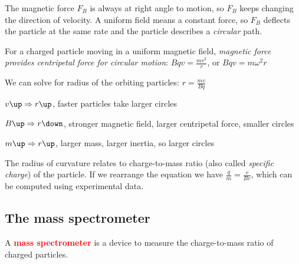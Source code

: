 \documentclass[a4paper,12pt]{book}
\newenvironment{ilight}
  {\centering
  	\vspace*{6pt}
  	\begin{tcolorbox}[colframe=Gray,colback=LightGrey!15]
  \setlength{\baselineskip}{\baselineskip}%
  }
  {\end{tcolorbox}\vspace*{-4pt}}
\newcommand{\keypoint}[1]{\textbf{\textcolor{red}{#1}}}
\newcommand{\tcbhighmath}[1]{\boxed{#1}}
\newcommand{\keypoint}[1]{\textbf{\textcolor{red}{#1}}}
\begin{document}
The magnetic force $F_B$ is always at right angle to motion, so $F_B$ keeps changing the direction of velocity. A uniform field means a constant force, so $F_B$ deflects the particle at the same rate and the particle describes a \emph{circular} path.

\begin{ilight}
	For a charged particle moving in a uniform magnetic field, \emph{magnetic force provides centripetal force for circular motion}: $\tcbhighmath{Bqv = \frac{mv^2}{r}}$, or $\tcbhighmath{Bqv = m \omega^2 r}$
\end{ilight}

We can solve for radius of the orbiting particles: $r=\frac{mv}{Bq}$

\begin{compactenum}

\item[-] $v\up \Rightarrow r\up$, faster particles take larger circles
	
\item[-] $B\up \Rightarrow r\down$, stronger magnetic field, larger centripetal force, smaller circles
	
\item[-] $m\up \Rightarrow r\up$, larger mass, larger inertia, so larger circles

\end{compactenum}
	
The radius of curvature relates to charge-to-mass ratio (also called \emph{specific charge}) of the particle. If we rearrange the equation we have $\frac{q}{m}=\frac{v}{Br}$, which can be computed using experimental data.

	
\subsection{The mass spectrometer}

A \keypoint{mass spectrometer} is a device to measure the charge-to-mass ratio of charged particles.
\end{document}
